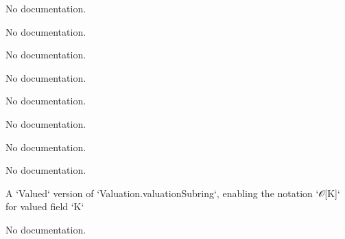 \begin{theorem}\label{Herbrand_Thm}
                No documentation.
    \end{theorem}

\begin{theorem}\label{varphi_comp_field_ext}
                No documentation.
    \end{theorem}

\begin{theorem}\label{psi_comp_field_ext}
                No documentation.
    \end{theorem}

\begin{theorem}\label{Valued.le_iff_val_le}
                No documentation.
    \end{theorem}

\begin{theorem}\label{Valued.lt_iff_val_lt}
                No documentation.
    \end{theorem}

\begin{theorem}\label{Valued.le_one_iff_val_le_one}
                No documentation.
    \end{theorem}

\begin{theorem}\label{Valued.lt_one_iff_val_lt_one}
                No documentation.
    \end{theorem}

\begin{theorem}\label{Valued.zero_le}
                No documentation.
    \end{theorem}

\begin{definition}\label{Valued.valuationSubring}
        \leanok
                A `Valued` version of `Valuation.valuationSubring`, enabling the notation `𝒪[K]` for valued field `K`
    \end{definition}

\begin{theorem}\label{Valued.integer_valuation_eq}
        \leanok
                No documentation.
    \end{theorem}

